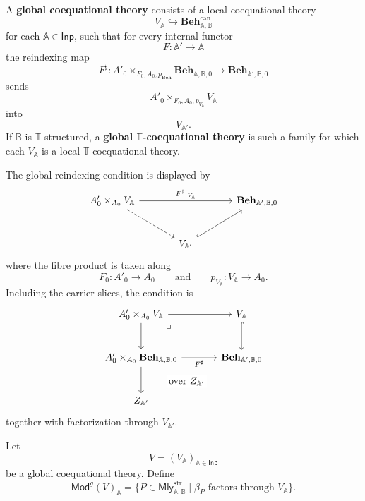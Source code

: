 \begin{definition}
\label{def:global-mealy-coequational-theory}
    A \textbf{global coequational theory} consists of a local coequational
    theory
    \[
        V_{\mathbb A}\hookrightarrow
        \mathbf{Beh}^{\mathrm{can}}_{\mathbb A,\mathbb B}
    \]
    for each \(\mathbb A\in\mathsf{Inp}\), such that for every internal functor
    \[
        F:\mathbb A'\to\mathbb A
    \]
    the reindexing map
    \[
        F^\sharp:
        A'_0\times_{F_0,A_0,p_{\mathbf{Beh}}}
        \mathbf{Beh}_{\mathbb A,\mathbb B,0}
        \to
        \mathbf{Beh}_{\mathbb A',\mathbb B,0}
    \]
    sends
    \[
        A'_0\times_{F_0,A_0,p_{V_{\mathbb A}}}V_{\mathbb A}
    \]
    into
    \[
        V_{\mathbb A'}.
    \]
    If \(\mathbb B\) is \(\mathbb T\)-structured, a \textbf{global
    \(\mathbb T\)-coequational theory} is such a family for which each
    \(V_{\mathbb A}\) is a local \(\mathbb T\)-coequational theory.
\end{definition}

The global reindexing condition is displayed by
\[
\begin{tikzcd}[column sep=large, row sep=large]
    A'_0\times_{A_0}V_{\mathbb A}
        \arrow[rr, "{F^\sharp|_{V_{\mathbb A}}}"]
        \arrow[dr, dashed]
    &&
    \mathbf{Beh}_{\mathbb A',\mathbb B,0}
    \\
    &
    V_{\mathbb A'}
        \arrow[ur, hook]
    &
\end{tikzcd}
\]
where the fibre product is taken along
\[
    F_0:A'_0\to A_0
    \qquad\text{and}\qquad
    p_{V_{\mathbb A}}:V_{\mathbb A}\to A_0.
\]
Including the carrier slices, the condition is
\[
\begin{tikzcd}[column sep=large, row sep=large]
    A'_0\times_{A_0}V_{\mathbb A}
        \arrow[r]
        \arrow[d]
        \arrow[dr, phantom, "\lrcorner", very near start]
    &
    V_{\mathbb A}
        \arrow[d, hook]
    \\
    A'_0\times_{A_0}\mathbf{Beh}_{\mathbb A,\mathbb B,0}
        \arrow[r, "F^\sharp"']
        \arrow[d]
    &
    \mathbf{Beh}_{\mathbb A',\mathbb B,0}
    \\
    Z_{\mathbb A'}
        \arrow[ur, phantom, "\text{over }Z_{\mathbb A'}" description]
    &
\end{tikzcd}
\]
together with factorization through \(V_{\mathbb A'}\).

\begin{definition}
\label{def:global-models}
    Let
    \[
        V=(V_{\mathbb A})_{\mathbb A\in\mathsf{Inp}}
    \]
    be a global coequational theory. Define
    \[
        \mathsf{Mod}^{g}(V)_{\mathbb A}
        =
        \{P\in\mathsf{Mly}^{\mathrm{str}}_{\mathbb A,\mathbb B}
          \mid
          \beta_P\text{ factors through }V_{\mathbb A}\}.
    \]
\end{definition}

